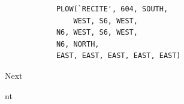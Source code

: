 \documentclass[compress]{beamer}
\begin{document}
\bgroup
{}

\begin{frame}[fragile]
\begin{verbatim}
            PLOW(`RECITE', 604, SOUTH,
                WEST, S6, WEST,
            N6, WEST, S6, WEST,
            N6, NORTH,
            EAST, EAST, EAST, EAST, EAST)
\end{verbatim}
\end{frame}

\egroup

\begin{wordframe}
Next
\end{wordframe}

\begin{imageframe}{nt}
\end{imageframe}

\emptyslide
\end{document}
